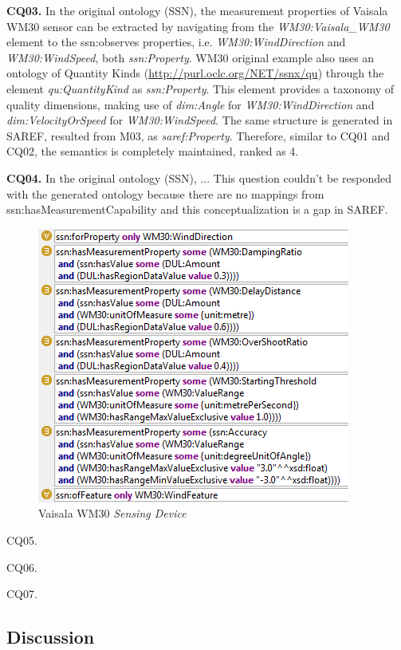 \documentclass{sig-alternate-05-2015}
\begin{document}
\textbf{CQ03.} In the original ontology (SSN), the measurement properties of Vaisala WM30 sensor can be extracted by navigating from the \textit{WM30:Vaisala\_WM30} element to the ssn:observes properties, i.e. \textit{WM30:WindDirection} and \textit{WM30:WindSpeed}, both \textit{ssn:Property}. WM30 original example also uses an ontology of Quantity Kinds (\url{http://purl.oclc.org/NET/ssnx/qu}) through the element \textit{qu:QuantityKind} as \textit{ssn:Property}. This element provides a taxonomy of quality dimensions, making use of \textit{dim:Angle} for \textit{WM30:WindDirection} and \textit{dim:VelocityOrSpeed} for \textit{WM30:WindSpeed}. The same structure is generated in SAREF, resulted from M03, as \textit{saref:Property}. Therefore, similar to CQ01 and CQ02, the semantics is completely maintained, ranked as 4.

\textbf{CQ04.} In the original ontology (SSN), ...
This question couldn't be responded with the generated ontology because there are no mappings from ssn:hasMeasurementCapability and this conceptualization  is a gap in SAREF.  

\begin{figure}[h!]
\centering
\includegraphics[scale=0.87]{SSN_MeasurementCapability}
\caption{Vaisala WM30 \textit{Sensing Device}} 
\label{fig:SSN_MeasurementCapability}
\end{figure}

CQ05.

CQ06.

CQ07. 

\subsection{Discussion}
\end{document}
